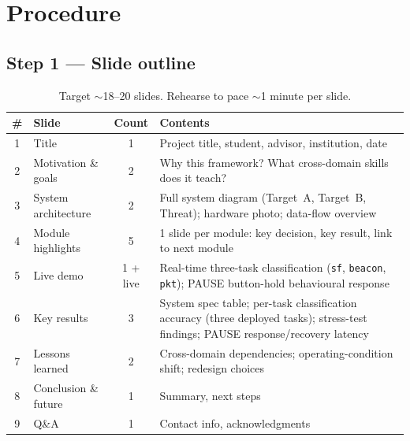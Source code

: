 \documentclass[11pt,letterpaper]{article}
\begin{document}
\section{Procedure}

\subsection{Step 1 --- Slide outline}

\begin{table}[h!]
	\centering
	\renewcommand{\arraystretch}{1.3}
	\begin{tabularx}{\textwidth}{c l c X}
		\toprule
		\textbf{\#} & \textbf{Slide} & \textbf{Count} & \textbf{Contents} \\
		\midrule
		1 & Title                 & 1 & Project title, student, advisor, institution, date \\
		2 & Motivation \& goals   & 2 & Why this framework? What cross-domain skills does it teach? \\
		3 & System architecture   & 2 & Full system diagram (Target~A, Target~B, Threat); hardware photo; data-flow overview \\
		4 & Module highlights     & 5 & 1 slide per module: key decision, key result, link to next module \\
		5 & Live demo             & 1 + live & Real-time three-task classification (\texttt{sf}, \texttt{beacon}, \texttt{pkt}); PAUSE button-hold behavioural response \\
		6 & Key results           & 3 & System spec table; per-task classification accuracy (three deployed tasks); stress-test findings; PAUSE response/recovery latency \\
		7 & Lessons learned       & 2 & Cross-domain dependencies; operating-condition shift; redesign choices \\
		8 & Conclusion \& future  & 1 & Summary, next steps \\
		9 & \mbox{Q\&A}           & 1 & Contact info, acknowledgments \\
		\bottomrule
	\end{tabularx}
	\caption{Target $\sim$18--20 slides. Rehearse to pace $\sim$1 minute per slide.}
\end{table}
\end{document}
